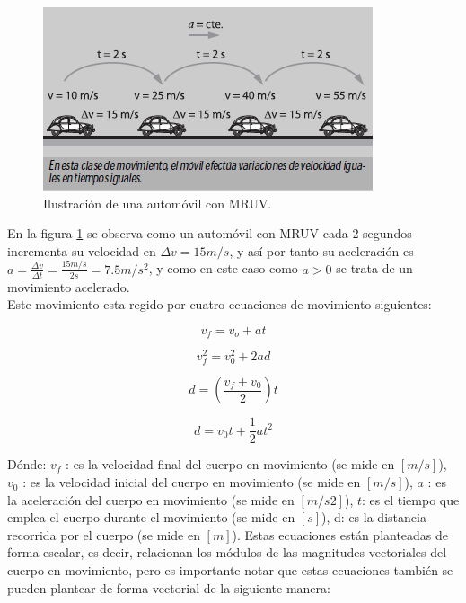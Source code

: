 \documentclass[a5paper,pagesize,10pt,bibtotoc,pointlessnumbers,
normalheadings,DIV=9,fleqn,x11names,table,twoside=false]{scrbook}
\begin{document}
\begin{figure}[ht]
 \centering
 \includegraphics[scale=0.7]{images/mruv.png}
 \caption{Ilustración de una automóvil con MRUV.}\label{mruv}
\end{figure} 

En la figura \ref{mruv} se observa como un automóvil con MRUV cada 2 segundos incrementa su velocidad en $\Delta v = 15 m/s$, y 
así por tanto su aceleración es $a = \frac{\Delta v}{\Delta t} = \frac{15 m/s}{2s} = 7.5 m/s^2$, y como en este caso como $a>0$ 
se trata de un movimiento acelerado.\\

Este movimiento esta regido por cuatro ecuaciones de movimiento siguientes:

\begin{equation}
 v_f = v_o + at
\end{equation}

\begin{equation}
 v_f^2 = v_0^2 + 2ad
\end{equation}

\begin{equation}
 d = (\frac{v_f+v_0}{2})t
\end{equation}

\begin{equation}
 d = v_0t+ \frac{1}{2}at^2
\end{equation}

Dónde: $v_f$ : es la velocidad final del cuerpo en movimiento (se mide en $[m/s]$), $v_0$ : es la velocidad inicial del cuerpo en 
movimiento (se mide en $[m/s]$), $a$ : es la aceleración del cuerpo en movimiento (se mide en $[m/s 2]$), $t$: es el tiempo que 
emplea el cuerpo durante el movimiento (se mide en $[s]$), d: es la distancia recorrida por el cuerpo (se mide en $[m]$). Estas 
ecuaciones están planteadas de forma escalar, es decir, relacionan los módulos de las magnitudes vectoriales del cuerpo en 
movimiento, pero es importante notar que estas ecuaciones también se pueden plantear de forma vectorial de la siguiente manera: 
\end{document}
